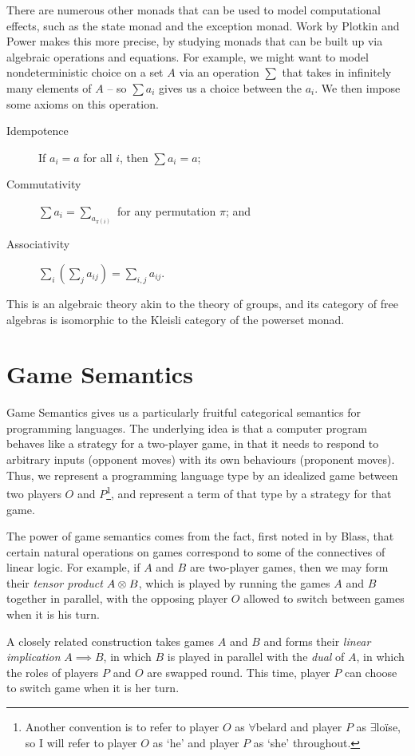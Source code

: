 \documentclass[11pt]{report}
\begin{document}
There are numerous other monads that can be used to model computational effects, such as the state monad and the exception monad.  
Work by Plotkin and Power \cite{PlotkinPower} makes this more precise, by studying monads that can be built up via algebraic operations and equations.  
For example, we might want to model nondeterministic choice on a set $A$ via an operation $\sum$ that takes in infinitely many elements of $A$ -- so $\sum a_i$ gives us a choice between the $a_i$.  
We then impose some axioms on this operation.
\begin{description}
  \item[Idempotence] If $a_i=a$ for all $i$, then $\sum a_i=a$;
  \item[Commutativity] $\sum a_i = \sum_{a_{\pi(i)}}$ for any permutation $\pi$; and
  \item[Associativity] $\sum_i (\sum_j a_{ij}) = \sum_{i,j} a_{ij}$.
\end{description}
This is an algebraic theory akin to the theory of groups, and its category of free algebras is isomorphic to the Kleisli category of the powerset monad.

\section{Game Semantics}

Game Semantics gives us a particularly fruitful categorical semantics for programming languages.  
The underlying idea is that a computer program behaves like a strategy for a two-player game, in that it needs to respond to arbitrary inputs (opponent moves) with its own behaviours (proponent moves).  
Thus, we represent a programming language type by an idealized game between two players $O$ and $P$\footnote{Another convention is to refer to player $O$ as $\forall{}$belard and player $P$ as $\exists{}$lo\"{i}se, so I will refer to player $O$ as `he' and player $P$ as `she' throughout.}, and represent a term of that type by a strategy for that game.

The power of game semantics comes from the fact, first noted in \cite{blassgames} by Blass, that certain natural operations on games correspond to some of the connectives of linear logic.  
For example, if $A$ and $B$ are two-player games, then we may form their \emph{tensor product} $A\otimes B$, which is played by running the games $A$ and $B$ together in parallel, with the opposing player $O$ allowed to switch between games when it is his turn.

A closely related construction takes games $A$ and $B$ and forms their \emph{linear implication} $A\implies B$, in which $B$ is played in parallel with the \emph{dual} of $A$, in which the roles of players $P$ and $O$ are swapped round.  
This time, player $P$ can choose to switch game when it is her turn.
\end{document}
